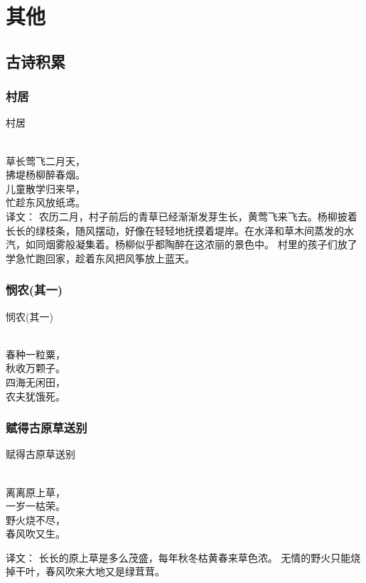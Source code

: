 \chapter{其他}
\section{古诗积累}
\subsection{村居}

	\noindent 村居
	
	  \\
	
	\noindent 草长莺飞二月天，\\拂堤杨柳醉春烟。\\
	儿童散学归来早，\\忙趁东风放纸鸢。\\


译文：
农历二月，村子前后的青草已经渐渐发芽生长，黄莺飞来飞去。杨柳披着长长的绿枝条，随风摆动，好像在轻轻地抚摸着堤岸。在水泽和草木间蒸发的水汽，如同烟雾般凝集着。杨柳似乎都陶醉在这浓丽的景色中。
村里的孩子们放了学急忙跑回家，趁着东风把风筝放上蓝天。

\subsection{悯农(其一)}

\noindent 悯农(其一)

  \\

\noindent 春种一粒粟，\\秋收万颗子。\\
四海无闲田，\\农夫犹饿死。

\subsection{赋得古原草送别}

\noindent 赋得古原草送别

  \\

\noindent 离离原上草，\\一岁一枯荣。\\
野火烧不尽，\\春风吹又生。

译文：
长长的原上草是多么茂盛，每年秋冬枯黄春来草色浓。
无情的野火只能烧掉干叶，春风吹来大地又是绿茸茸。

